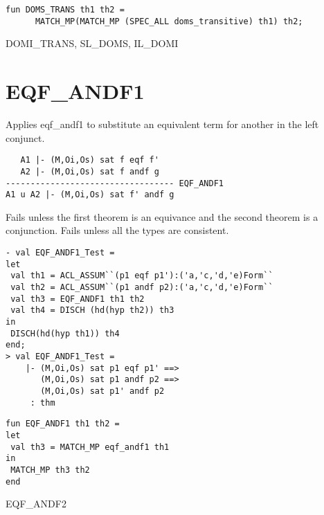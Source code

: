 \IMPLEMENTATION
\begin{holboxed}
\begin{verbatim}
fun DOMS_TRANS th1 th2 =
      MATCH_MP(MATCH_MP (SPEC_ALL doms_transitive) th1) th2;
\end{verbatim}
\end{holboxed}

\SEEALSO
DOMI\_TRANS, SL\_DOMS, IL\_DOMI
\ENDDOC

\section{EQF\_ANDF1}



\egroup

\SYNOPSIS 
Applies eqf_andf1 to substitute an equivalent term for
another in the left conjunct.

\DESCRIBE
\begin{verbatim}
   A1 |- (M,Oi,Os) sat f eqf f'  
   A2 |- (M,Oi,Os) sat f andf g 
---------------------------------- EQF_ANDF1
A1 u A2 |- (M,Oi,Os) sat f' andf g
\end{verbatim}

\FAILURE
Fails unless the first theorem is an equivance and the second theorem
is a conjunction.  Fails unless all the types are consistent.

\EXAMPLE
\begin{holboxed}
\begin{verbatim}
- val EQF_ANDF1_Test =
let
 val th1 = ACL_ASSUM``(p1 eqf p1'):('a,'c,'d,'e)Form``
 val th2 = ACL_ASSUM``(p1 andf p2):('a,'c,'d,'e)Form``
 val th3 = EQF_ANDF1 th1 th2
 val th4 = DISCH (hd(hyp th2)) th3
in
 DISCH(hd(hyp th1)) th4
end;
> val EQF_ANDF1_Test =
    |- (M,Oi,Os) sat p1 eqf p1' ==>
       (M,Oi,Os) sat p1 andf p2 ==>
       (M,Oi,Os) sat p1' andf p2
     : thm
\end{verbatim}
\end{holboxed}

\IMPLEMENTATION

\begin{holboxed}
\begin{verbatim}
fun EQF_ANDF1 th1 th2 =
let
 val th3 = MATCH_MP eqf_andf1 th1
in
 MATCH_MP th3 th2
end
\end{verbatim}
\end{holboxed}
\SEEALSO
EQF\_ANDF2


